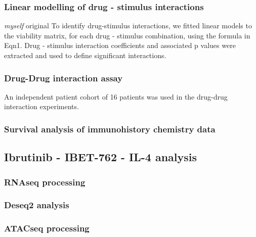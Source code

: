 \documentclass[11pt, a4paper, twosided]{book}
\begin{document}
\hypertarget{linear-modelling-of-drug---stimulus-interactions-1}{%
\subsubsection{Linear modelling of drug - stimulus interactions}\label{linear-modelling-of-drug---stimulus-interactions-1}}

\emph{myself} original
To identify drug-stimulus interactions, we fitted linear models to the viability matrix, for each drug - stimulus combination, using the formula in Eqn1. Drug - stimulus interaction coefficients and associated p values were extracted and used to define significant interactions.

\hypertarget{drug-drug-interaction-assay}{%
\subsubsection{Drug-Drug interaction assay}\label{drug-drug-interaction-assay}}

An independent patient cohort of 16 patients was used in the drug-drug interaction experiments.

\hypertarget{survival-analysis-of-immunohistory-chemistry-data}{%
\subsubsection{Survival analysis of immunohistory chemistry data}\label{survival-analysis-of-immunohistory-chemistry-data}}

\hypertarget{ibrutinib---ibet-762---il-4-analysis}{%
\subsection{Ibrutinib - IBET-762 - IL-4 analysis}\label{ibrutinib---ibet-762---il-4-analysis}}

\hypertarget{rnaseq-processing}{%
\subsubsection{RNAseq processing}\label{rnaseq-processing}}

\hypertarget{deseq2-analysis}{%
\subsubsection{Deseq2 analysis}\label{deseq2-analysis}}

\hypertarget{atacseq-processing-1}{%
\subsubsection{ATACseq processing}\label{atacseq-processing-1}}
\end{document}
